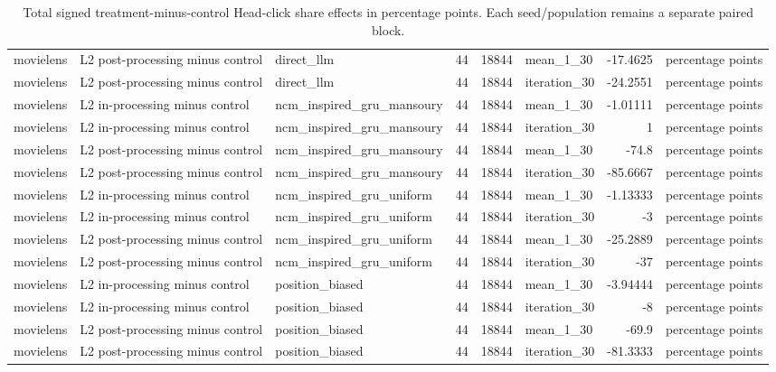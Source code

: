 \begin{table}[htbp!]
\begin{tabular}{lllrrlrl}
movielens & L2 post-processing minus control & direct\_llm & 44 & 18844 & mean\_1\_30 & -17.4625 & percentage points \\
movielens & L2 post-processing minus control & direct\_llm & 44 & 18844 & iteration\_30 & -24.2551 & percentage points \\
movielens & L2 in-processing minus control & ncm\_inspired\_gru\_mansoury & 44 & 18844 & mean\_1\_30 & -1.01111 & percentage points \\
movielens & L2 in-processing minus control & ncm\_inspired\_gru\_mansoury & 44 & 18844 & iteration\_30 & 1 & percentage points \\
movielens & L2 post-processing minus control & ncm\_inspired\_gru\_mansoury & 44 & 18844 & mean\_1\_30 & -74.8 & percentage points \\
movielens & L2 post-processing minus control & ncm\_inspired\_gru\_mansoury & 44 & 18844 & iteration\_30 & -85.6667 & percentage points \\
movielens & L2 in-processing minus control & ncm\_inspired\_gru\_uniform & 44 & 18844 & mean\_1\_30 & -1.13333 & percentage points \\
movielens & L2 in-processing minus control & ncm\_inspired\_gru\_uniform & 44 & 18844 & iteration\_30 & -3 & percentage points \\
movielens & L2 post-processing minus control & ncm\_inspired\_gru\_uniform & 44 & 18844 & mean\_1\_30 & -25.2889 & percentage points \\
movielens & L2 post-processing minus control & ncm\_inspired\_gru\_uniform & 44 & 18844 & iteration\_30 & -37 & percentage points \\
movielens & L2 in-processing minus control & position\_biased & 44 & 18844 & mean\_1\_30 & -3.94444 & percentage points \\
movielens & L2 in-processing minus control & position\_biased & 44 & 18844 & iteration\_30 & -8 & percentage points \\
movielens & L2 post-processing minus control & position\_biased & 44 & 18844 & mean\_1\_30 & -69.9 & percentage points \\
movielens & L2 post-processing minus control & position\_biased & 44 & 18844 & iteration\_30 & -81.3333 & percentage points \\
\hline
\end{tabular}
\caption{Total signed treatment-minus-control Head-click share effects in percentage points. Each seed/population remains a separate paired block.}
\label{chap:results:tab:rq4_head_click_effects}
\end{table}
